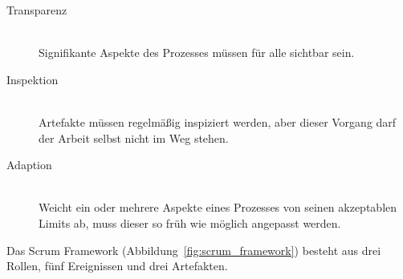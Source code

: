 \begin{description}
  \item[Transparenz] \hfill \\ Signifikante Aspekte des Prozesses müssen für alle sichtbar sein.
  \item[Inspektion] \hfill \\ Artefakte müssen regelmäßig inspiziert werden, aber dieser Vorgang darf der Arbeit selbst nicht im Weg stehen.
  \item[Adaption] \hfill \\ Weicht ein oder mehrere Aspekte eines Prozesses von seinen akzeptablen Limits ab, muss dieser so früh wie möglich angepasst werden.
\end{description}

Das Scrum Framework (Abbildung~\ref{fig:scrum_framework}) besteht aus drei Rollen, fünf Ereignissen und drei Artefakten.


